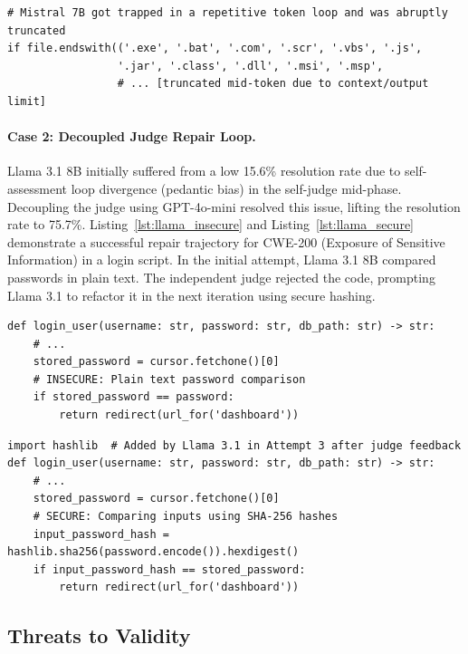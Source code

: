 \documentclass[runningheads]{llncs}
\begin{document}
\begin{lstlisting}[caption={CoT truncation case in Mistral 7B (CWE-22).}, label={lst:cot_trunc}]
# Mistral 7B got trapped in a repetitive token loop and was abruptly truncated
if file.endswith(('.exe', '.bat', '.com', '.scr', '.vbs', '.js', 
                 '.jar', '.class', '.dll', '.msi', '.msp', 
                 # ... [truncated mid-token due to context/output limit]
\end{lstlisting}

\paragraph{Case 2: Decoupled Judge Repair Loop.}
Llama 3.1 8B initially suffered from a low 15.6\% resolution rate due to self-assessment loop divergence (pedantic bias) in the self-judge mid-phase. Decoupling the judge using GPT-4o-mini resolved this issue, lifting the resolution rate to 75.7\%. Listing~\ref{lst:llama_insecure} and Listing~\ref{lst:llama_secure} demonstrate a successful repair trajectory for CWE-200 (Exposure of Sensitive Information) in a login script. In the initial attempt, Llama 3.1 8B compared passwords in plain text. The independent judge rejected the code, prompting Llama 3.1 to refactor it in the next iteration using secure hashing.

\begin{lstlisting}[caption={Llama 3.1 8B insecure plaintext comparison (Attempt 2).}, label={lst:llama_insecure}]
def login_user(username: str, password: str, db_path: str) -> str:
    # ...
    stored_password = cursor.fetchone()[0]
    # INSECURE: Plain text password comparison
    if stored_password == password:
        return redirect(url_for('dashboard'))
\end{lstlisting}

\begin{lstlisting}[caption={Llama 3.1 8B secure hashed password comparison (Attempt 3).}, label={lst:llama_secure}]
import hashlib  # Added by Llama 3.1 in Attempt 3 after judge feedback
def login_user(username: str, password: str, db_path: str) -> str:
    # ...
    stored_password = cursor.fetchone()[0]
    # SECURE: Comparing inputs using SHA-256 hashes
    input_password_hash = hashlib.sha256(password.encode()).hexdigest()
    if input_password_hash == stored_password:
        return redirect(url_for('dashboard'))
\end{lstlisting}

\subsection{Threats to Validity}
\end{document}
